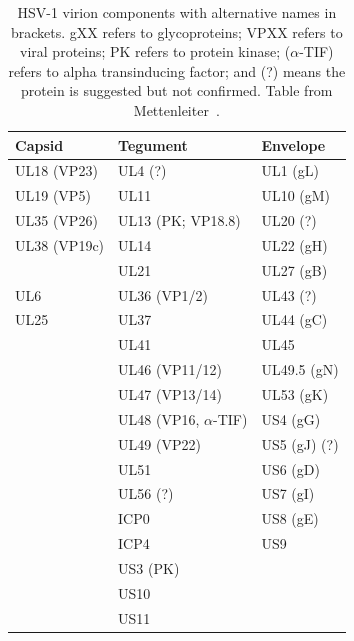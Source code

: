 \begin{table}[]
    \centering
    \caption[\gls{HSV}-1 virion components]{
    \gls{HSV}-1 virion components with alternative names in brackets.
    gXX refers to glycoproteins;
    VPXX refers to viral proteins;
    PK refers to protein kinase;
    (\(\alpha\)-TIF) refers to alpha transinducing factor;
    and (?) means the protein is suggested but not confirmed.
    Table from Mettenleiter~\cite{mettenleiterHerpesvirusAssemblyEgress2002}.
    }\label{tab:virus_proteins}
\begin{tabular}{lll}
    \toprule
Capsid       & Tegument           & Envelope     \\
\midrule
UL18 (VP23)  & UL4 (?)            & UL1 (gL)     \\
UL19 (VP5)   & UL11               & UL10 (gM)    \\
UL35 (VP26)  & UL13 (PK; VP18.8)  & UL20 (?)     \\
UL38 (VP19c) & UL14               & UL22 (gH)    \\
             & UL21               & UL27 (gB)    \\
UL6          & UL36 (VP1/2)       & UL43 (?)     \\
UL25         & UL37               & UL44 (gC)    \\
             & UL41          & UL45         \\
             & UL46 (VP11/12)     & UL49.5 (gN)  \\
             & UL47 (VP13/14)     & UL53 (gK)    \\
             & UL48 (VP16, \(\alpha\)-TIF) & US4 (gG)     \\
             & UL49 (VP22)        & US5 (gJ) (?) \\
             & UL51               & US6 (gD)     \\
             & UL56 (?)           & US7 (gI)     \\
             & ICP0               & US8 (gE)     \\
             & ICP4               & US9          \\
             & US3 (PK)           &              \\
             & US10               &              \\
             & US11               &         \\
             \bottomrule
\end{tabular}
\end{table}

